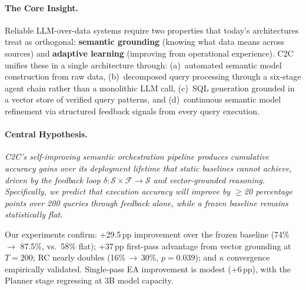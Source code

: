 \documentclass[11pt,a4paper]{article}
\begin{document}
\paragraph{The Core Insight.}
Reliable LLM-over-data systems require two properties that today's architectures
treat as orthogonal: \textbf{semantic grounding} (knowing what data means across
sources) and \textbf{adaptive learning} (improving from operational experience).
C2C unifies these in a single architecture through: (a)~automated semantic model
construction from raw data, (b)~decomposed query processing through a six-stage
agent chain rather than a monolithic LLM call, (c)~SQL generation grounded in a
vector store of verified query patterns, and (d)~continuous semantic model
refinement via structured feedback signals from every query execution.

\paragraph{Central Hypothesis.}
\emph{C2C's self-improving semantic orchestration pipeline produces cumulative
accuracy gains over its deployment lifetime that static baselines cannot achieve,
driven by the feedback loop $\delta : \mathcal{S} \times \mathcal{F} \to \mathcal{S}$
and vector-grounded reasoning.  Specifically, we predict that execution accuracy
will improve by $\geq$20 percentage points over 200 queries through feedback alone,
while a frozen baseline remains statistically flat.}

Our experiments confirm: +29.5\,pp improvement over the frozen baseline (74\%
$\to$ 87.5\%, vs.\ 58\% flat); +37\,pp first-pass advantage from vector grounding
at $T{=}200$; RC nearly doubles (16\%\,$\to$\,30\%, $p{=}0.039$); and $\kappa$
convergence empirically validated.  Single-pass EA improvement is modest (+6\,pp),
with the Planner stage regressing at 3B model capacity.
\end{document}
